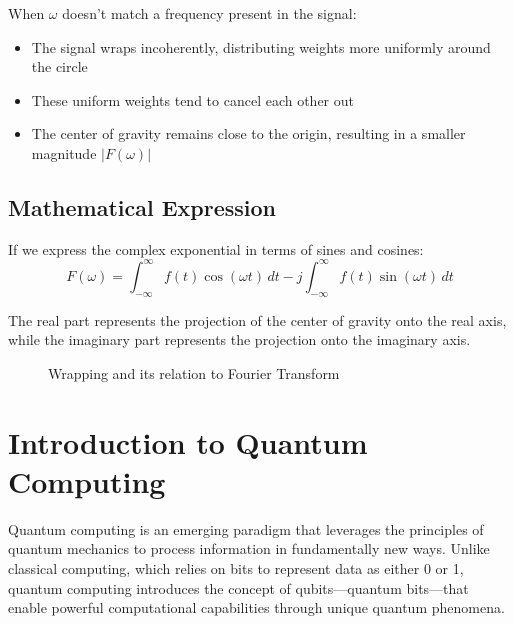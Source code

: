 \documentclass{article}
\begin{document}
When $\omega$ doesn't match a frequency present in the signal:
\begin{itemize}
    \item The signal wraps incoherently, distributing weights more uniformly around the circle
    \item These uniform weights tend to cancel each other out
    \item The center of gravity remains close to the origin, resulting in a smaller magnitude $|F(\omega)|$
\end{itemize}

\subsection{Mathematical Expression}

If we express the complex exponential in terms of sines and cosines:
\[
    F(\omega) = \int_{-\infty}^{\infty} f(t) \cos(\omega t) \, dt - j\int_{-\infty}^{\infty} f(t) \sin(\omega t) \, dt
\]

The real part represents the projection of the center of gravity onto the real axis, while the imaginary part represents the projection onto the imaginary axis.

\begin{figure}[p]
    \centering
    \caption{Wrapping and its relation to Fourier Transform}
    \label{fig:complete_fourier}
\end{figure}


\section{Introduction to Quantum Computing}
Quantum computing is an emerging paradigm that leverages the principles of quantum mechanics to process information in fundamentally new ways. Unlike classical computing, which relies on bits to represent data as either 0 or 1, quantum computing introduces the concept of qubits---quantum bits---that enable powerful computational capabilities through unique quantum phenomena.
\end{document}
